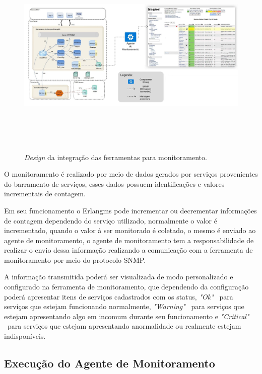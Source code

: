 \begin{figure}[H]
	\begin{center}
	\includegraphics[width = 18cm, height = 10cm]{img/arqtProjeto.jpeg}
	\caption{\textit{Design} da integração das ferramentas para monitoramento.}
	\label{fun:fig:arqtProjeto}
	\end{center}
\end{figure}


O monitoramento é realizado por meio de dados gerados por serviços provenientes do barramento de serviços, esses dados possuem identificações e valores incrementais de contagem. 

Em seu funcionamento o Erlangms pode incrementar ou decrementar informações de contagem dependendo do serviço utilizado, normalmente o valor é incrementado, quando o valor à ser monitorado é coletado, o mesmo é enviado ao agente de monitoramento, o agente de monitoramento tem a responsabilidade de realizar o envio dessa informação realizando a comunicação com a ferramenta de monitoramento por meio do protocolo \acrshort{SNMP}. 

A informação transmitida poderá ser visualizada de modo personalizado e configurado na ferramenta de monitoramento, que dependendo da configuração poderá apresentar itens de serviços cadastrados com os status, \textit{"Ok"} \ para serviços que estejam funcionando normalmente, \textit{"Warning"} \  para serviços que estejam apresentando algo em incomum durante seu funcionamento e \textit{"Critical"} \ para serviços que estejam apresentando anormalidade ou realmente estejam indisponíveis.	 


\subsection{Execução do Agente de Monitoramento}

